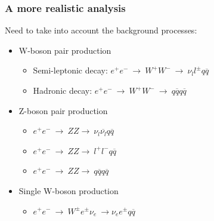 \documentclass{beamer}
\begin{document}
\begin{frame}
    \frametitle{A more realistic analysis}

    {\footnotesize{
            \vspace{-0.3cm}
            \begin{block}{Need to take into account the background processes:}
                \begin{itemize}
                    \item W-boson pair production
                        \vspace{-0.1cm}
                        \begin{itemize}
                            \item Semi-leptonic decay: $e^+e^- \ \rightarrow \ W^+W^- \ \rightarrow \  \nu_l l^{\pm}q\overline{q}$
                            \item Hadronic decay: $e^+e^- \ \rightarrow \ W^+W^- \ \rightarrow \  q\overline{q}q\overline{q}$
                        \end{itemize}
                        \vspace{-0.2cm}
                    \item Z-boson pair production
                        \vspace{-0.1cm}
                        \begin{itemize}
                            \item $e^+e^- \ \rightarrow \  ZZ \rightarrow \ \nu_l \overline{\nu_l }q \overline{q}$ 
                            \item $e^+e^- \ \rightarrow \  ZZ \rightarrow \ l^+ l^- q \overline{q}$ 
                            \item $e^+e^- \ \rightarrow \  ZZ \rightarrow \ q \overline{q} q\overline{q}$ 
                        \end{itemize}
                        \vspace{-0.2cm}
                    \item Single W-boson production
                        \vspace{-0.1cm}
                        \begin{itemize}
                            \item $e^+e^- \ \rightarrow \ W^{\pm} e^{\pm} \nu_e \ \rightarrow \nu_ee^{\pm}q\overline{q}$
                        \end{itemize}

\end{itemize}
\end{block}}}
\end{frame}
\end{document}
